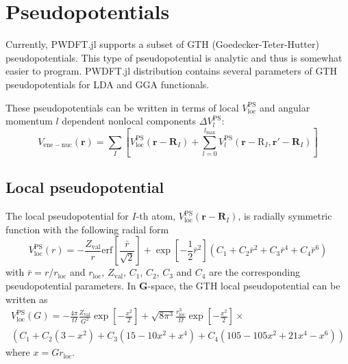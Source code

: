 \section{Pseudopotentials}
%
Currently, \textsf{PWDFT.jl} supports a subset of GTH (Goedecker-Teter-Hutter)
pseudopotentials. This type of pseudopotential is analytic and thus is somewhat
easier to program.
%
\textsf{PWDFT.jl} distribution contains several parameters
of GTH pseudopotentials for LDA and GGA functionals.

These pseudopotentials can be written in terms of
local $V^{\mathrm{PS}}_{\mathrm{loc}}$ and
angular momentum $l$ dependent
nonlocal components $\Delta V^{\mathrm{PS}}_{l}$:
\begin{equation}
V_{\mathrm{ene-nuc}}(\mathbf{r}) =
\sum_{I} \left[
V^{\mathrm{PS}}_{\mathrm{loc}}(\mathbf{r}-\mathbf{R}_{I}) +
\sum_{l=0}^{l_{\mathrm{max}}}
V^{\mathrm{PS}}_{l}(\mathbf{r}-\mathrm{R}_{I},\mathbf{r}'-\mathbf{R}_{I})
\right]
\end{equation}

\subsection{Local pseudopotential}

The local pseudopotential for
$I$-th atom, $V^{\mathrm{PS}}_{\mathrm{loc}}(\mathbf{r}-\mathbf{R}_{I})$,
is radially symmetric
function with the following radial form
\begin{equation}
V^{\mathrm{PS}}_{\mathrm{loc}}(r) =
-\frac{Z_{\mathrm{val}}}{r}\mathrm{erf}\left[
\frac{\bar{r}}{\sqrt{2}} \right] +
\exp\left[-\frac{1}{2}\bar{r}^2\right]\left(
C_{1} + C_{2}\bar{r}^2 + C_{3}\bar{r}^4 + C_{4}\bar{r}^6
\right)
\label{eq:V_ps_loc_R}
\end{equation}
with $\bar{r}=r/r_{\mathrm{loc}}$ and $r_{\mathrm{loc}}$, $Z_{\mathrm{val}}$,
$C_{1}$, $C_{2}$, $C_{3}$ and $C_{4}$ are the corresponding pseudopotential
parameters.
In $\mathbf{G}$-space, the GTH local pseudopotential can be written as
\begin{multline}
V^{\mathrm{PS}}_{\mathrm{loc}}(G) = -\frac{4\pi}{\Omega}\frac{Z_{\mathrm{val}}}{G^2}
\exp\left[-\frac{x^2}{2}\right] +
\sqrt{8\pi^3} \frac{r^{3}_{\mathrm{loc}}}{\Omega}\exp\left[-\frac{x^2}{2}\right]\times\\
\left( C_{1} + C_{2}(3 - x^2) + C_{3}(15 - 10x^2 + x^4) + C_{4}(105 - 105x^2 + 21x^4 - x^6) \right)
\label{eq:V_ps_loc_G}
\end{multline}
where $x=G r_{\mathrm{loc}}$.

